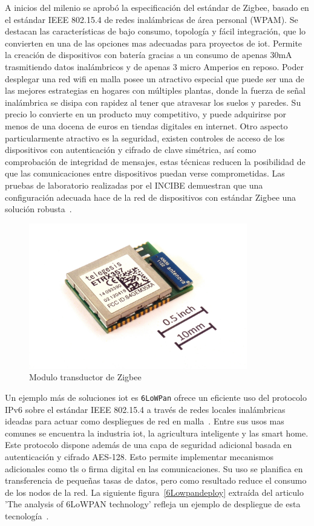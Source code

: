 A inicios del milenio se aprobó la especificación del estándar de Zigbee, basado en el estándar IEEE 802.15.4 de redes inalámbricas de área personal (WPAM). Se destacan las características de bajo consumo, topología y fácil integración, que lo convierten en una de las opciones mas adecuadas para proyectos de \gls{iot}. Permite la creación de dispositivos con batería gracias a un consumo de apenas 30mA  trasmitiendo datos inalámbricos y de apenas 3 micro Amperios en reposo. Poder desplegar una red \gls{wifi} en malla posee un atractivo especial que puede ser una de las mejores estrategias en hogares con múltiples plantas, donde la fuerza de señal inalámbrica se disipa con rapidez al tener que atravesar los suelos y paredes. Su precio lo convierte en un producto muy competitivo, y puede adquirirse por menos de una docena de euros en tiendas digitales en internet. Otro aspecto particularmente atractivo es la seguridad, existen controles de acceso de los dispositivos con autenticación y cifrado de clave simétrica, así como comprobación de integridad de mensajes, estas técnicas reducen la posibilidad de que las comunicaciones entre dispositivos puedan verse comprometidas. Las pruebas de laboratorio realizadas por el INCIBE demuestran que una configuración adecuada hace de la red de dispositivos con estándar Zigbee una solución robusta~\cite{incibe_zigbee}.
 
\begin{figure}[hbt!]
\centering
\includegraphics[height=2.5in]{figures/ETRX357_ZigBee_module_with_size_ref.jpg}
\caption[Modulo transductor de 2.4Gh Zigbee ETRX357]{Modulo transductor de Zigbee\footnotemark}
\end{figure}

\vspace{1cm}

Un ejemplo más de soluciones \gls{iot} es \verb|6LoWPan| ofrece un eficiente uso del protocolo IPv6 sobre el estándar IEEE 802.15.4 a través de redes locales inalámbricas ideadas para actuar como despliegues de red en malla~\cite{montenegro2007rfc}. Entre sus usos mas comunes se encuentra la industria \gls{iot}, la agricultura inteligente y las smart home. Este protocolo dispone además de una capa de seguridad adicional basada en autenticación y cifrado AES-128. Esto permite implementar mecanismos adicionales como \gls{tls} o firma digital en las comunicaciones. Su uso se planifica en transferencia de pequeñas tasas de datos, pero como resultado reduce el consumo de los nodos de la red. La siguiente figura~\ref{6Lowpandeploy} extraída del articulo 'The analysis of 6LoWPAN technology' refleja un ejemplo de despliegue de esta tecnología~\cite{ma2008analysis}.

